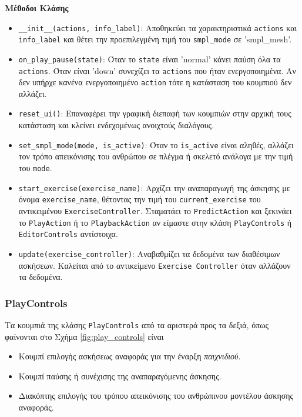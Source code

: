 \noindent\textbf{Μέθοδοι Κλάσης}
\begin{itemize}
	\item \texttt{\_\_init\_\_(actions, info\_label)}: Αποθηκεύει τα χαρακτηριστικά \texttt{actions} και \texttt{info\_label} και θέτει την προεπιλεγμένη τιμή του \texttt{smpl\_mode} σε 'smpl\_mesh'.
	\item \texttt{on\_play\_pause(state)}: Όταν το \texttt{state} είναι 'normal' κάνει παύση όλα τα \texttt{actions}. Όταν είναι 'down' συνεχίζει τα \texttt{actions} που ήταν ενεργοποιημένα. Αν δεν υπήρχε κανένα ενεργοποιημένο \texttt{action} τότε η κατάσταση του κουμπιού δεν αλλάζει.
	\item \texttt{reset\_ui()}: Επαναφέρει την γραφική διεπαφή των κουμπιών στην αρχική τους κατάσταση και κλείνει ενδεχομένως ανοιχτούς διαλόγους.
	\item \texttt{set\_smpl\_mode(mode, is\_active)}: Όταν το \texttt{is\_active} είναι αληθές, αλλάζει τον τρόπο απεικόνισης του ανθρώπου σε πλέγμα ή σκελετό ανάλογα με την τιμή του \texttt{mode}.
	\item \texttt{start\_exercise(exercise\_name)}: Αρχίζει την αναπαραγωγή της άσκησης με όνομα \texttt{exercise\_name}, θέτοντας την τιμή του \texttt{current\_exercise} του αντικειμένου \texttt{ExerciseController}. Σταματάει το \texttt{PredictAction} και ξεκινάει το \texttt{PlayAction} ή το \texttt{PlaybackAction} αν είμαστε στην κλάση \texttt{PlayControls} ή \texttt{EditorControls} αντίστοιχα.
	\item \texttt{update(exercise\_controller)}: Αναβαθμίζει τα δεδομένα των διαθέσιμων ασκήσεων. Καλείται από το αντικείμενο \texttt{Exercise Controller} όταν αλλάζουν τα δεδομένα.
\end{itemize}

\subsubsection{PlayControls}
Τα κουμπιά της κλάσης \texttt{PlayControls} από τα αριστερά προς τα δεξιά, όπως φαίνονται στο Σχήμα \ref{fig:play_controls} είναι
\begin{itemize}
	\item Κουμπί επιλογής ασκήσεως αναφοράς για την έναρξη \textsl{παιχνιδιού}.
	\item Κουμπί παύσης ή συνέχισης της αναπαραγόμενης άσκησης.
	\item Διακόπτης επιλογής του τρόπου απεικόνισης του ανθρώπινου μοντέλου άσκησης αναφοράς.
\end{itemize}

